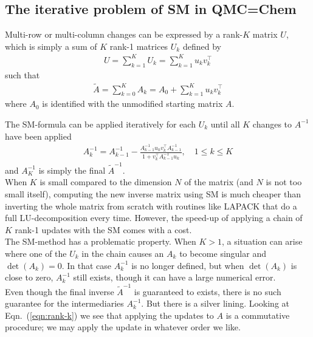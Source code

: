 \documentclass[11pt]{article}
\numberwithin{figure}{section}
\numberwithin{table}{section}
\begin{document}
			
          \subsection{The iterative problem of SM in QMC=Chem}
			Multi-row or multi-column changes can be expressed by a rank-$K$ matrix $U$, which is simply a sum of $K$ rank-1 matrices $U_k$ defined by
			\begin{align}
				U = \sum_{k=1}^K U_k = \sum_{k=1}^K u_kv_k^\top
			\end{align}
			such that 
			\begin{align}\label{eqn:rank-k}
				\widetilde{A} = \sum_{k=0}^K A_k =  A_0 + \sum_{k=1}^K u_kv_k^\top
			\end{align}
			where $A_0$ is identified with the unmodified starting matrix $A$.
			
			The SM-formula can be applied iteratively for each $U_k$ until all $K$ changes to $A^{-1}$ have been applied
			\begin{align}\label{eqn:sm}
				A^{-1}_k = A^{-1}_{k-1} - \frac{A^{-1}_{k-1}u_kv_k^\top A^{-1}_{k-1}}{1+v_k^\top A^{-1}_{k-1}u_k}, \quad 1 \leq k \leq K   
			\end{align}
			and $A_K^{-1}$ is simply the final $\widetilde{A}^{-1}$.\\
			
			When $K$ is small compared to the dimension $N$ of the matrix (and $N$ is not too small itself), computing the new inverse matrix using SM is much cheaper than inverting the whole matrix from scratch with routines like LAPACK that do a full LU-decomposition every time. However, the speed-up of applying a chain of $K$ rank-1 updates with the SM comes with a cost.\\
			
			The SM-method has a problematic property. When $K>1$, a situation can arise where one of the $U_k$ in the chain causes an $A_k$ to become singular and $\det\left(A_k\right)=0$. In that case $A^{-1}_{k}$ is no longer defined, but when $\det\left(A_k\right)$ is close to zero, $A^{-1}_{k}$ still exists, though it can have a large numerical error.\\
			
			Even though the final inverse $\widetilde{A}^{-1}$ is guaranteed to exists, there is no such guarantee for the intermediaries $A_k^{-1}$. But there is a silver lining. Looking at Eqn.~(\ref{eqn:rank-k}) we see that applying the updates to $A$ is a commutative procedure; we may apply the update in whatever order we like.\\
			
\end{document}
